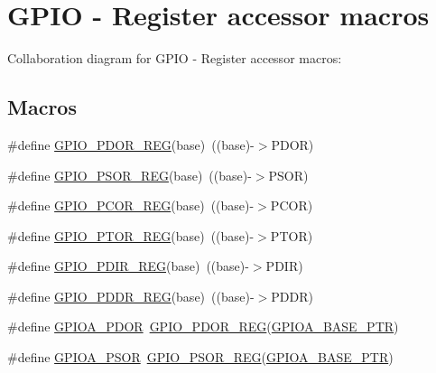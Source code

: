 \hypertarget{group___g_p_i_o___register___accessor___macros}{}\section{G\+P\+IO -\/ Register accessor macros}
\label{group___g_p_i_o___register___accessor___macros}
Collaboration diagram for G\+P\+IO -\/ Register accessor macros\+:
\subsection*{Macros}
\begin{DoxyCompactItemize}
\item 
\#define \hyperlink{group___g_p_i_o___register___accessor___macros_ga9a1866048e6b4643f38c8f1345b6ee60}{G\+P\+I\+O\+\_\+\+P\+D\+O\+R\+\_\+\+R\+EG}(base)~((base)-\/$>$P\+D\+OR)
\item 
\#define \hyperlink{group___g_p_i_o___register___accessor___macros_gab745be6958ca2e22e2b475a611f473ca}{G\+P\+I\+O\+\_\+\+P\+S\+O\+R\+\_\+\+R\+EG}(base)~((base)-\/$>$P\+S\+OR)
\item 
\#define \hyperlink{group___g_p_i_o___register___accessor___macros_ga97e0b9004936c347bd4728e34a5bd5cf}{G\+P\+I\+O\+\_\+\+P\+C\+O\+R\+\_\+\+R\+EG}(base)~((base)-\/$>$P\+C\+OR)
\item 
\#define \hyperlink{group___g_p_i_o___register___accessor___macros_gac6579b41a85fbb464dacde9472ad7d83}{G\+P\+I\+O\+\_\+\+P\+T\+O\+R\+\_\+\+R\+EG}(base)~((base)-\/$>$P\+T\+OR)
\item 
\#define \hyperlink{group___g_p_i_o___register___accessor___macros_ga2c24da45995f7a27504c3789daae14ce}{G\+P\+I\+O\+\_\+\+P\+D\+I\+R\+\_\+\+R\+EG}(base)~((base)-\/$>$P\+D\+IR)
\item 
\#define \hyperlink{group___g_p_i_o___register___accessor___macros_ga61dac233f8be25e95cd419eb79714a07}{G\+P\+I\+O\+\_\+\+P\+D\+D\+R\+\_\+\+R\+EG}(base)~((base)-\/$>$P\+D\+DR)
\item 
\#define \hyperlink{group___g_p_i_o___register___accessor___macros_ga5c5a9a4e809579e68ae743d931312cc5}{G\+P\+I\+O\+A\+\_\+\+P\+D\+OR}~\hyperlink{group___g_p_i_o___register___accessor___macros_ga9a1866048e6b4643f38c8f1345b6ee60}{G\+P\+I\+O\+\_\+\+P\+D\+O\+R\+\_\+\+R\+EG}(\hyperlink{group___g_p_i_o___peripheral_ga3a8bd75d8b47b51132005ce9bbcbab7f}{G\+P\+I\+O\+A\+\_\+\+B\+A\+S\+E\+\_\+\+P\+TR})
\item 
\#define \hyperlink{group___g_p_i_o___register___accessor___macros_gaa89816040d1c6678e816aa3e7a7eef07}{G\+P\+I\+O\+A\+\_\+\+P\+S\+OR}~\hyperlink{group___g_p_i_o___register___accessor___macros_gab745be6958ca2e22e2b475a611f473ca}{G\+P\+I\+O\+\_\+\+P\+S\+O\+R\+\_\+\+R\+EG}(\hyperlink{group___g_p_i_o___peripheral_ga3a8bd75d8b47b51132005ce9bbcbab7f}{G\+P\+I\+O\+A\+\_\+\+B\+A\+S\+E\+\_\+\+P\+TR})

\end{DoxyCompactItemize}
